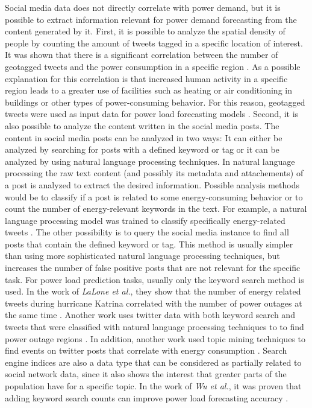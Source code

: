 Social media data does not directly correlate with power demand, but it is
possible to extract information relevant for power demand forecasting
from the content generated by it.
First, it is possible to analyze the spatial density of people by 
counting the amount of tweets tagged in a specific location of interest. 
It was shown that there is a significant
correlation between the number of geotagged tweets
and the power consumption in a specific region \cite{twittergeoloccorr}.
As a possible explanation for this correlation is that 
increased human activity in a specific region leads to a greater 
use of facilities such as heating or air conditioning in buildings or 
other types of power-consuming behavior.
For this reason, geotagged tweets were used as input data for 
power load forecasting models 
\cite{twittergeolocforecasting} \cite{twittergeolocforecasting2}.
Second, it is also possible to analyze the content written in the 
social media posts. The content in social media posts can be 
analyzed in two ways: 
It can either be analyzed by searching for posts with a defined keyword or tag
or it can be analyzed by using natural language processing techniques. 
In natural language processing the raw text content 
(and possibly its metadata and attachements) of a post is analyzed
to extract the desired information. Possible analysis
methods would be to classify if a post is related to some energy-consuming
behavior or to count the number of energy-relevant keywords in the text.
For example, a natural language processing model was trained to 
classify specifically energy-related tweets \cite{energybert}.
The other possibility is to query the social media instance 
to find all posts that contain the defined keyword or tag.
This method is usually simpler than using more sophisticated natural 
language processing techniques, but increases the number of false positive 
posts that are not relevant for the specific task.
For power load prediction tasks, usually only the keyword search method is used.
In the work of \textit{LaLone et al.}, they show that the number of energy
related tweets during hurricane Katrina correlated with the number of 
power outages at the same time \cite{poweroutagetwitter}.
Another work uses twitter data with both keyword search and 
tweets that were classified with natural language processing techniques to
to find power outage regions \cite{twitterpoweroutagelighttime}.
In addition, another work used topic mining techniques to find
events on twitter posts that correlate with energy consumption 
\cite{twittertopicevent}.
Search engine indices are also a data type that can be considered 
as partially related to social network data, since it also shows the 
interest that greater parts of the population have for a specific topic.
In the work of \textit{Wu et al.}, it was proven that adding 
keyword search counts can improve power load forecasting accuracy 
\cite{googlepowerforecast}.

